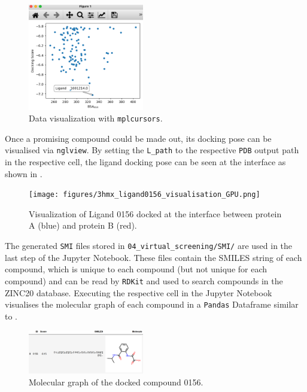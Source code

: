 \documentclass[9pt,tutorial]{livecoms}
\newcommand{\code}[1]{\colorbox{light-gray}{\texttt{#1}}}
\begin{document}
\begin{figure}[H]
\centering
\includegraphics[width=0.45\textwidth]{figures/mplcursor_BSA_dockingscore.png}
\caption{Data visualization with \code{mplcursors}.}
\label{fig:mplcursor_BSA_dockingscore}
\end{figure}

Once a promising compound could be made out, its docking pose can be visualised via \code{nglview}. By setting the \code{L\_path} to the respective \texttt{PDB} output path in the respective cell, the ligand docking pose can be seen at the interface as shown in .

\begin{figure}[H]
\centering
\texttt{[image: figures/3hmx\_ligand0156\_visualisation\_GPU.png]}
\caption{Visualization of Ligand 0156 docked at the interface between protein A (blue) and protein B (red).}
\label{fig:3hmx_ligand0156_visualisation_GPU}
\end{figure}

The generated \texttt{SMI} files stored in \code{04\_virtual\_screening/SMI/} are used in the last step of the Jupyter Notebook. These files contain the SMILES string of each compound, which is unique to each compound (but not unique for each compound) and can be read by \texttt{RDKit} and used to search compounds in the ZINC20 database. Executing the respective cell in the Jupyter Notebook visualises the molecular graph of each compound in a \texttt{Pandas} Dataframe similar to . 

\begin{figure}[H]
\centering
\includegraphics[width=0.45\textwidth]{figures/ligand0156_RDkit.png}
\caption{Molecular graph of the docked compound 0156.}
\label{fig:ligand0156_RDkit}
\end{figure}
\end{document}
